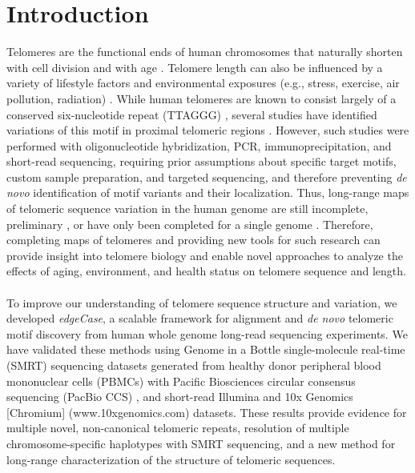 \documentclass{article}
\begin{document}
\section*{Introduction} 
    Telomeres are the functional ends of human chromosomes that naturally shorten with cell division and with age \parencite{teloaging}.
    Telomere length can also be influenced by a variety of lifestyle factors and environmental exposures
        (e.g., stress, exercise, air pollution, radiation) \parencite{teloeffects}.
    While human telomeres are known to consist largely of a conserved six-nucleotide repeat (TTAGGG) \parencite{moyzis},
        several studies have identified variations of this motif in proximal telomeric regions
            \parencite{telovars1989,telovars1999,telovars2018,telovars2019}.
    However, such studies were performed with oligonucleotide hybridization, PCR, immunoprecipitation, and short-read sequencing,
        requiring prior assumptions about specific target motifs, custom sample preparation, and targeted sequencing,
        and therefore preventing \textit{de novo} identification of motif variants and their localization.
    Thus, long-range maps of telomeric sequence variation in the human genome are still incomplete, preliminary \parencite{shafin},
        or have only been completed for a single genome \parencite{jain,t2t}.
    Therefore, completing maps of telomeres and providing new tools for such research \parencite{nurk} can provide insight into
        telomere biology and enable novel approaches to analyze the effects of aging, environment, and health status \parencite{telovars2018}
        on telomere sequence and length.
    \\~\\
    To improve our understanding of telomere sequence structure and variation, we developed \textit{edgeCase},
        a scalable framework for alignment and \textit{de novo} telomeric motif discovery
        from human whole genome long-read sequencing experiments.
    We have validated these methods using
        Genome in a Bottle \parencite{giab} single-molecule real-time (SMRT) sequencing datasets
            generated from healthy donor peripheral blood mononuclear cells (PBMCs)
            with Pacific Biosciences circular consensus sequencing (PacBio CCS) \parencite{pacbio,pacbioccs},
        and short-read Illumina \parencite{illumina} and 10x Genomics [Chromium] (www.10xgenomics.com) datasets.
    These results provide evidence for
        multiple novel, non-canonical telomeric repeats,
        resolution of multiple chromosome-specific haplotypes with SMRT sequencing,
        and a new method for long-range characterization of the structure of telomeric sequences.
\end{document}
